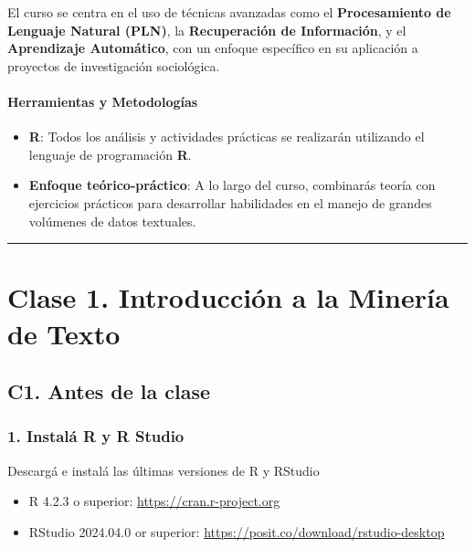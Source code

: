 \documentclass[
  letterpaper,
  DIV=11,
  numbers=noendperiod]{scrreprt}
\providecommand{\tightlist}{%
  \setlength{\itemsep}{0pt}\setlength{\parskip}{0pt}}
\begin{document}
El curso se centra en el uso de técnicas avanzadas como el
\textbf{Procesamiento de Lenguaje Natural (PLN)}, la
\textbf{Recuperación de Información}, y el \textbf{Aprendizaje
Automático}, con un enfoque específico en su aplicación a proyectos de
investigación sociológica.

\subsection{Herramientas y
Metodologías}\label{herramientas-y-metodologuxedas}

\begin{itemize}
\tightlist
\item
  \textbf{R}: Todos los análisis y actividades prácticas se realizarán
  utilizando el lenguaje de programación \textbf{R}.
\item
  \textbf{Enfoque teórico-práctico}: A lo largo del curso, combinarás
  teoría con ejercicios prácticos para desarrollar habilidades en el
  manejo de grandes volúmenes de datos textuales.
\end{itemize}

\begin{center}\rule{0.5\linewidth}{0.5pt}\end{center}

\part{\textbf{Clase 1. Introducción a la Minería de Texto}}

\chapter{C1. Antes de la clase}\label{c1.-antes-de-la-clase}

\section{\texorpdfstring{\textbf{1. Instalá R y R
Studio}}{1. Instalá R y R Studio}}\label{instaluxe1-r-y-r-studio}

Descargá e instalá las últimas versiones de R y RStudio

\begin{itemize}
\item
  R 4.2.3 o superior:
  \href{https://cran.r-project.org/}{https://cran.r-project.org}
\item
  RStudio 2024.04.0 or superior:
  \url{https://posit.co/download/rstudio-desktop}
\end{itemize}
\end{document}
